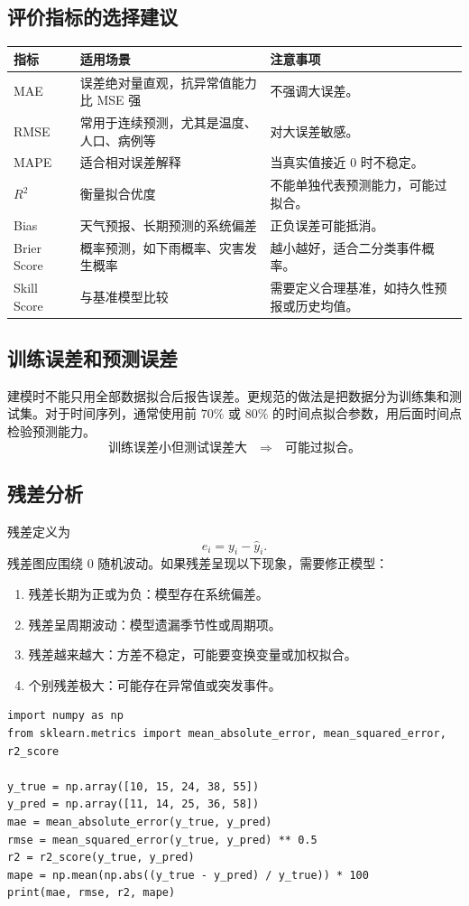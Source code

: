 \documentclass[11pt,a4paper]{ctexart}
\begin{document}
\subsection{评价指标的选择建议}
\begin{longtable}{p{3cm}p{5.2cm}p{5.1cm}}
\toprule
指标 & 适用场景 & 注意事项 \\
\midrule
MAE & 误差绝对量直观，抗异常值能力比 MSE 强 & 不强调大误差。\\
RMSE & 常用于连续预测，尤其是温度、人口、病例等 & 对大误差敏感。\\
MAPE & 适合相对误差解释 & 当真实值接近 0 时不稳定。\\
$R^2$ & 衡量拟合优度 & 不能单独代表预测能力，可能过拟合。\\
Bias & 天气预报、长期预测的系统偏差 & 正负误差可能抵消。\\
Brier Score & 概率预测，如下雨概率、灾害发生概率 & 越小越好，适合二分类事件概率。\\
Skill Score & 与基准模型比较 & 需要定义合理基准，如持久性预报或历史均值。\\
\bottomrule
\end{longtable}

\subsection{训练误差和预测误差}
建模时不能只用全部数据拟合后报告误差。更规范的做法是把数据分为训练集和测试集。对于时间序列，通常使用前 $70\%$ 或 $80\%$ 的时间点拟合参数，用后面时间点检验预测能力。
\[
\text{训练误差小但测试误差大}\quad\Longrightarrow\quad\text{可能过拟合。}
\]

\subsection{残差分析}
残差定义为
\[
e_i=y_i-\hat y_i.
\]
残差图应围绕 0 随机波动。如果残差呈现以下现象，需要修正模型：
\begin{enumerate}[itemsep=0.2em]
\item 残差长期为正或为负：模型存在系统偏差。
\item 残差呈周期波动：模型遗漏季节性或周期项。
\item 残差越来越大：方差不稳定，可能要变换变量或加权拟合。
\item 个别残差极大：可能存在异常值或突发事件。
\end{enumerate}

\begin{lstlisting}[style=pythonstyle,caption={评价指标计算代码}]
import numpy as np
from sklearn.metrics import mean_absolute_error, mean_squared_error, r2_score

y_true = np.array([10, 15, 24, 38, 55])
y_pred = np.array([11, 14, 25, 36, 58])
mae = mean_absolute_error(y_true, y_pred)
rmse = mean_squared_error(y_true, y_pred) ** 0.5
r2 = r2_score(y_true, y_pred)
mape = np.mean(np.abs((y_true - y_pred) / y_true)) * 100
print(mae, rmse, r2, mape)
\end{lstlisting}
\end{document}
